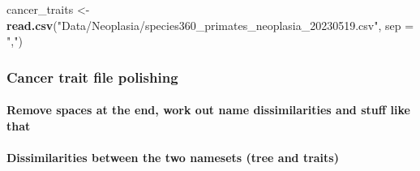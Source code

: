 \documentclass[
]{article}
\newenvironment{Shaded}{\begin{snugshade}}{\end{snugshade}}
\newcommand{\AttributeTok}[1]{\textcolor[rgb]{0.13,0.29,0.53}{#1}}
\newcommand{\CommentTok}[1]{\textcolor[rgb]{0.56,0.35,0.01}{\textit{#1}}}
\newcommand{\ControlFlowTok}[1]{\textcolor[rgb]{0.13,0.29,0.53}{\textbf{#1}}}
\newcommand{\FunctionTok}[1]{\textcolor[rgb]{0.13,0.29,0.53}{\textbf{#1}}}
\newcommand{\NormalTok}[1]{#1}
\newcommand{\OtherTok}[1]{\textcolor[rgb]{0.56,0.35,0.01}{#1}}
\newcommand{\SpecialCharTok}[1]{\textcolor[rgb]{0.81,0.36,0.00}{\textbf{#1}}}
\newcommand{\StringTok}[1]{\textcolor[rgb]{0.31,0.60,0.02}{#1}}
\begin{document}
\begin{Shaded}
\begin{Highlighting}[]
\NormalTok{cancer\_traits }\OtherTok{\textless{}{-}} \FunctionTok{read.csv}\NormalTok{(}\StringTok{"Data/Neoplasia/species360\_primates\_neoplasia\_20230519.csv"}\NormalTok{, }\AttributeTok{sep =} \StringTok{","}\NormalTok{)}
\end{Highlighting}
\end{Shaded}

\hypertarget{cancer-trait-file-polishing}{%
\subsubsection{Cancer trait file
polishing}\label{cancer-trait-file-polishing}}

\hypertarget{remove-spaces-at-the-end-work-out-name-dissimilarities-and-stuff-like-that}{%
\paragraph{Remove spaces at the end, work out name dissimilarities and
stuff like
that}\label{remove-spaces-at-the-end-work-out-name-dissimilarities-and-stuff-like-that}}

\begin{Shaded}
\end{Shaded}

\hypertarget{dissimilarities-between-the-two-namesets-tree-and-traits}{%
\paragraph{Dissimilarities between the two namesets (tree and
traits)}\label{dissimilarities-between-the-two-namesets-tree-and-traits}}
\end{document}
